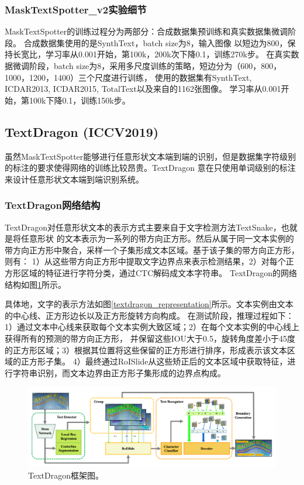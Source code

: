 \subsubsection{MaskTextSpotter\_v2实验细节}
MaskTextSpotter的训练过程分为两部分：合成数据集预训练和真实数据集微调阶段。
合成数据集使用的是SynthText\cite{gupta2016synthetic}，batch size为8，输入图像
以短边为800，保持长宽比，学习率从0.001开始，第100k，200k次下降0.1，训练270k步。
在真实数据微调阶段，batch size为8，采用多尺度训练的策略，短边分为（600，800，1000，1200，1400）三个尺度进行训练，
使用的数据集有SynthText, ICDAR2013, ICDAR2015, TotalText以及来自\cite{zhong2016deeptext}的1162张图像。
学习率从0.001开始，第100k下降0.1，训练150k步。

\subsection{TextDragon (ICCV2019)}
虽然MaskTextSpotter能够进行任意形状文本端到端的识别，但是数据集字符级别的标注的要求使得网络的训练比较昂贵。TextDragon
意在只使用单词级别的标注来设计任意形状文本端到端识别系统。
\subsubsection{TextDragon网络结构}
TextDragon对任意形状文本的表示方式主要来自于文字检测方法TextSnake\cite{long2018textsnake}，也就是将任意形状
的文本表示为一系列的带方向正方形。然后从属于同一文本实例的带方向正方形中聚合，采样一个子集形成文本区域。基于该子集的带方向正方形，
则有：
1）从这些带方向正方形中提取文字边界点来表示检测结果，2）对每个正方形区域的特征进行字符分类，通过CTC解码成文本字符串。
TextDragon的网络结构如图\ref{textdragon_framework}所示。

具体地，文字的表示方法如图\ref{textdragon_representation}所示。文本实例由文本的中心线、正方形边长以及正方形旋转方向构成。
在测试阶段，推理过程如下：1）通过文本中心线来获取每个文本实例大致区域；2）在每个文本实例的中心线上获得所有的预测的带方向正方形，
并保留这些IOU大于0.5，旋转角度差小于45度的正方形区域；3）根据其位置将这些保留的正方形进行排序，形成表示该文本区域的正方形子集。
4）最终通过RoISlide从这些矫正后的文本区域中获取特征，进行字符串识别，而文本边界由正方形子集形成的边界点构成。
\begin{figure}[htb]
    \centering
    \includegraphics[width=.98\textwidth]{figure/spotting/textdragon_framework.png} 
    \caption{TextDragon框架图。} 
    \label{textdragon_framework} 
\end{figure}

